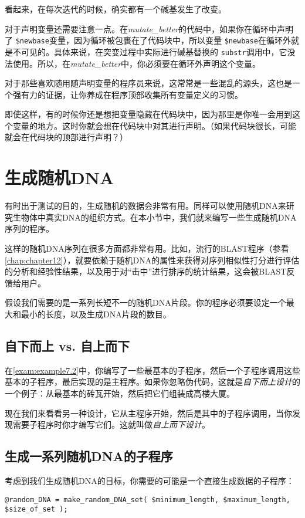 看起来，在每次迭代的时候，确实都有一个碱基发生了改变。

对于声明变量还需要注意一点。在\textit{mutate\_better}的代码中，如果你在循环中声明了 \verb|$newbase|变量，因为循环被包裹在了代码块中，所以变量 \verb|$newbase|在循环外就是不可见的。具体来说，在突变过程中实际进行碱基替换的 \verb|substr|调用中，它没法使用。所以，在\textit{mutate\_better}中，你必须要在循环外声明这个变量。

对于那些喜欢随用随声明变量的程序员来说，这常常是一些混乱的源头，这也是一个强有力的证据，让你养成在程序顶部收集所有变量定义的习惯。

即使这样，有的时候你还是想把变量隐藏在代码块中，因为那里是你唯一会用到这个变量的地方。这时你就会想在代码块中对其进行声明。（如果代码块很长，可能就会在代码块的顶部进行声明？）

\section{生成随机DNA} 
有时出于测试的目的，生成随机的数据会非常有用。同样可以使用随机DNA来研究生物体中真实DNA的组织方式。在本小节中，我们就来编写一些生成随机DNA序列的程序。

这样的随机DNA序列在很多方面都非常有用。比如，流行的BLAST程序（参看\autoref{chap:chapter12}），就要依赖于随机DNA的属性来获得对序列相似性打分进行评估的分析和经验性结果，以及用于对“击中”进行排序的统计结果，这会被BLAST反馈给用户。

假设我们需要的是一系列长短不一的随机DNA片段。你的程序必须要设定一个最大和最小的长度，以及生成DNA片段的数目。

\subsection{自下而上 vs. 自上而下}
在\autoref{exam:example7.2}中，你编写了一些最基本的子程序，然后一个子程序调用这些基本的子程序，最后实现的是主程序。如果你忽略伪代码，这就是\textit{自下而上设计}的一个例子：从最基本的砖瓦开始，然后把它们组装成高楼大厦。

现在我们来看看另一种设计，它从主程序开始，然后是其中的子程序调用，当你发现需要子程序时你才编写它们。这就叫做\textit{自上而下设计}。

\subsection{生成一系列随机DNA的子程序}
考虑到我们生成随机DNA的目标，你需要的可能是一个直接生成数据的子程序：

\begin{lstlisting}
@random_DNA = make_random_DNA_set( $minimum_length, $maximum_length, $size_of_set );
\end{lstlisting}

